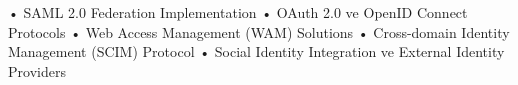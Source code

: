• SAML 2.0 Federation Implementation
• OAuth 2.0 ve OpenID Connect Protocols
• Web Access Management (WAM) Solutions
• Cross-domain Identity Management (SCIM) Protocol
• Social Identity Integration ve External Identity Providers